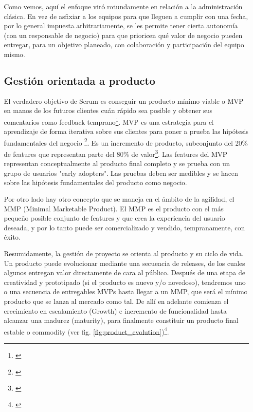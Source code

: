 Como vemos, aquí el enfoque viró rotundamente en relación a la administración clásica. En vez de asfixiar a los equipos para que lleguen a cumplir con una fecha, por lo general impuesta arbitrariamente, se les permite tener cierta autonomía (con un responsable de negocio) para que prioricen qué valor de negocio pueden entregar, para un objetivo planeado, con colaboración y participación del equipo mismo.

\subsection{Gestión orientada a producto}

El verdadero objetivo de Scrum es conseguir un producto mínimo viable o MVP en manos de los futuros clientes cuán rápido sea posible y obtener sus comentarios como feedback temprano\footnote{\cite{Jeff-Sutherland-2016}}. MVP es una estrategia para el aprendizaje de forma iterativa sobre sus clientes para poner a prueba las hipótesis fundamentales del negocio \footnote{\cite{Greg-Gehrich-2012}}. Es un incremento de producto, subconjunto del 20\% de features que representan parte del 80\% de valor\footnote{\cite{Jeff-Sutherland-2016}}. Las features del MVP representan conceptualmente al producto final completo y se prueba con un grupo de usuarios "early adopters". Las pruebas deben ser medibles y se hacen sobre las hipótesis fundamentales del producto como negocio.

Por otro lado hay otro concepto que se maneja en el ámbito de la agilidad, el MMP (Minimal Marketable Product). El MMP es el producto con el más pequeño posible conjunto de features y que crea la experiencia del usuario deseada, y por lo tanto puede ser comercializado y vendido, tempranamente, con éxito.

Resumidamente, la gestión de proyecto se orienta al producto y su ciclo de vida. Un producto puede evolucionar mediante una secuencia de releases, de los cuales algunos entregan valor directamente de cara al público. Después de una etapa de creatividad y prototipado (si el producto es nuevo y/o novedoso), tendremos uno o una secuencia de entregables MVPs hasta llegar a un MMP, que será el mínimo producto que se lanza al mercado como tal. De allí en adelante comienza el crecimiento en escalamiento (Growth) e incremento de funcionalidad hasta alcanzar una madurez (maturity), para finalmente constituir un producto final estable o commodity (ver fig. \ref{fig:product_evolution})\footnote{\cite{Greg-Gehrich-2012}}.

